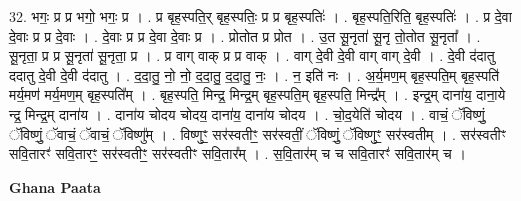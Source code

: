 \documentclass[17pt]{extarticle}
\begin{document}
32. भगः॒ प्र प्र भगो॒ भगः॒ प्र । . प्र बृह॒स्पति॒र् बृह॒स्पतिः॒ प्र प्र बृह॒स्पतिः॑ । . बृह॒स्पति॒रिति॒ बृह॒स्पतिः॑ । . प्र दे॒वा दे॒वाः प्र प्र दे॒वाः । . दे॒वाः प्र प्र दे॒वा दे॒वाः प्र । . प्रोतोत प्र प्रोत । . उ॒त सू॒नृता॑ सू॒नृ तो॒तोत सू॒नृता᳚ । . सू॒नृता॒ प्र प्र सू॒नृता॑ सू॒नृता॒ प्र । . प्र वाग् वाक् प्र प्र वाक् । . वाग् दे॒वी दे॒वी वाग् वाग् दे॒वी । . दे॒वी द॑दातु ददातु दे॒वी दे॒वी द॑दातु । . द॒दा॒तु॒ नो॒ नो॒ द॒दा॒तु॒ द॒दा॒तु॒ नः॒ । . न॒ इति॑ नः । . अ॒र्य॒मण॒म् बृह॒स्पति॒म् बृह॒स्पति॑ मर्य॒मण॑ मर्य॒मण॒म् बृह॒स्पति᳚म् । . बृह॒स्पति॒ मिन्द्र॒ मिन्द्र॒म् बृह॒स्पति॒म् बृह॒स्पति॒ मिन्द्र᳚म् । . इन्द्र॒म् दाना॑य॒ दाना॒ये न्द्र॒ मिन्द्र॒म् दाना॑य । . दाना॑य चोदय चोदय॒ दाना॑य॒ दाना॑य चोदय । . चो॒द॒येति॑ चोदय । . वाचं॒ ॅविष्णुं॒ ॅविष्णुं॒ ॅवाचं॒ ॅवाचं॒ ॅविष्णु᳚म् । . विष्णुꣳ॒॒ सर॑स्वतीꣳ॒॒ सर॑स्वतीं॒ ॅविष्णुं॒ ॅविष्णुꣳ॒॒ सर॑स्वतीम् । . सर॑स्वतीꣳ सवि॒तारꣳ॑ सवि॒तारꣳ॒॒ सर॑स्वतीꣳ॒॒ सर॑स्वतीꣳ सवि॒तार᳚म् । . स॒वि॒तार॑म् च च सवि॒तारꣳ॑ सवि॒तार॑म् च । \newline

\textbf{Ghana Paata } \newline
\end{document}
